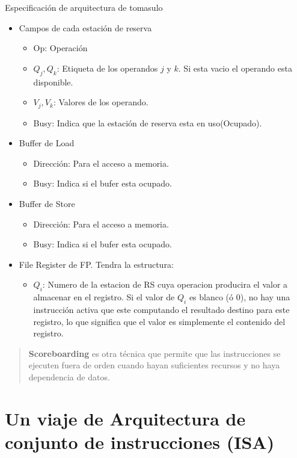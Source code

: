 \documentclass{article}
\begin{document}
Especificación  de arquitectura de tomasulo

\begin{itemize}
    \item Campos de cada estación de reserva
    \begin{itemize}
        \item Op: Operación
        \item \(Q_{j},Q_{k}\): Etiqueta de los operandos \(j\) y \(k\). Si esta vacio el operando esta disponible.
        \item \(V_{j},V_{k}\): Valores de los operando.
        \item Busy: Indica que la estación de reserva esta en uso(Ocupado). 
    \end{itemize}
    \item Buffer de Load
    \begin{itemize}
        \item Dirección: Para el acceso a memoria.
        \item Busy: Indica si el bufer esta ocupado.
    \end{itemize}
    \item Buffer de Store
    \begin{itemize}
        \item Dirección: Para el acceso a memoria.
        \item Busy: Indica si el bufer esta ocupado.    
    \end{itemize}
    \item File Register de FP. Tendra la estructura:
    \begin{itemize}
        \item \(Q_{i}\): Numero de la estacion de RS cuya operacion producira el valor a almacenar en el registro. Si el valor de \(Q_{i}\) es blanco (ó 0), no hay una instrucción activa que este computando el resultado destino para este registro, lo que significa que el valor es simplemente el contenido del registro.
    \end{itemize}
\end{itemize}

\begin{quote}
    \textbf{Scoreboarding} es otra técnica que permite que las instrucciones se ejecuten fuera de orden cuando hayan suficientes recursos y no haya dependencia de datos. 
\end{quote}

\section{Un viaje de Arquitectura de conjunto de instrucciones (ISA)}
\end{document}
